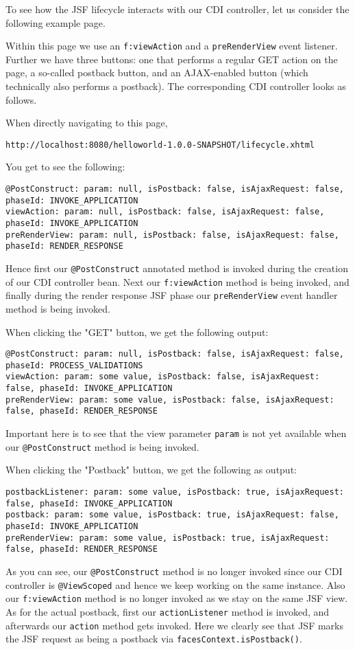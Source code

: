 To see how the JSF lifecycle interacts with our CDI controller, let us consider the following example page.

Within this page we use an \texttt{f:viewAction} and a \texttt{preRenderView} event listener.
Further we have three buttons: one that performs a regular GET action on the page, a so-called postback button, and an AJAX-enabled button (which technically also performs a postback).
The corresponding CDI controller looks as follows.

When directly navigating to this page,
\begin{lstlisting}
http://localhost:8080/helloworld-1.0.0-SNAPSHOT/lifecycle.xhtml
\end{lstlisting}
You get to see the following:
\begin{lstlisting}
@PostConstruct: param: null, isPostback: false, isAjaxRequest: false, phaseId: INVOKE_APPLICATION
viewAction: param: null, isPostback: false, isAjaxRequest: false, phaseId: INVOKE_APPLICATION
preRenderView: param: null, isPostback: false, isAjaxRequest: false, phaseId: RENDER_RESPONSE
\end{lstlisting}
Hence first our \texttt{@PostConstruct} annotated method is invoked during the creation of our CDI controller bean.
Next our \texttt{f:viewAction} method is being invoked, and finally during the render response JSF phase our \texttt{preRenderView} event handler method is being invoked.

When clicking the "GET" button, we get the following output:
\begin{lstlisting}
@PostConstruct: param: null, isPostback: false, isAjaxRequest: false, phaseId: PROCESS_VALIDATIONS
viewAction: param: some value, isPostback: false, isAjaxRequest: false, phaseId: INVOKE_APPLICATION
preRenderView: param: some value, isPostback: false, isAjaxRequest: false, phaseId: RENDER_RESPONSE
\end{lstlisting}
Important here is to see that the view parameter \texttt{param} is not yet available when our \texttt{@Post\allowbreak Construct} method is being invoked.

When clicking the "Postback" button, we get the following as output:
\begin{lstlisting}
postbackListener: param: some value, isPostback: true, isAjaxRequest: false, phaseId: INVOKE_APPLICATION
postback: param: some value, isPostback: true, isAjaxRequest: false, phaseId: INVOKE_APPLICATION
preRenderView: param: some value, isPostback: true, isAjaxRequest: false, phaseId: RENDER_RESPONSE
\end{lstlisting}
As you can see, our \texttt{@PostConstruct} method is no longer invoked since our CDI controller is \texttt{@ViewScoped} and hence we keep working on the same instance. Also our \texttt{f:viewAction} method is no longer invoked as we stay on the same JSF view.
As for the actual postback, first our \texttt{actionListener} method is invoked, and afterwards our \texttt{action} method gets invoked.
Here we clearly see that JSF marks the JSF request as being a postback via \texttt{facesContext.isPostback()}.

